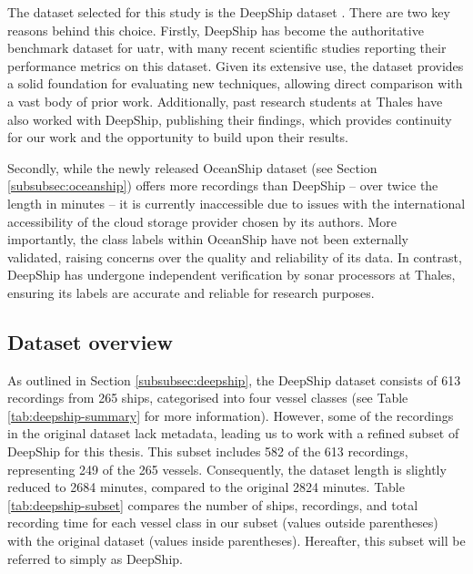 The dataset selected for this study is the DeepShip dataset \cite{irfan_deepship_2021}. There are two key reasons behind this choice. Firstly, DeepShip has become the authoritative benchmark dataset for \acrshort{uatr}, with many recent scientific studies reporting their performance metrics on this dataset. Given its extensive use, the dataset provides a solid foundation for evaluating new techniques, allowing direct comparison with a vast body of prior work. Additionally, past research students at Thales have also worked with DeepShip, publishing their findings, which provides continuity for our work and the opportunity to build upon their results.

Secondly, while the newly released OceanShip dataset (see Section \ref{subsubsec:oceanship}) offers more recordings than DeepShip -- over twice the length in minutes -- it is currently inaccessible due to issues with the international accessibility of the cloud storage provider chosen by its authors. More importantly, the class labels within OceanShip have not been externally validated, raising concerns over the quality and reliability of its data. In contrast, DeepShip has undergone independent verification by sonar processors at Thales, ensuring its labels are accurate and reliable for research purposes.

\subsection{Dataset overview}

As outlined in Section \ref{subsubsec:deepship}, the DeepShip dataset consists of 613 recordings from 265 ships, categorised into four vessel classes (see Table \ref{tab:deepship-summary} for more information). However, some of the recordings in the original dataset lack metadata, leading us to work with a refined subset of DeepShip for this thesis. This subset includes 582 of the 613 recordings, representing 249 of the 265 vessels. Consequently, the dataset length is slightly reduced to 2684 minutes, compared to the original 2824 minutes. Table \ref{tab:deepship-subset} compares the number of ships, recordings, and total recording time for each vessel class in our subset (values outside parentheses) with the original dataset (values inside parentheses). Hereafter, this subset will be referred to simply as DeepShip.

